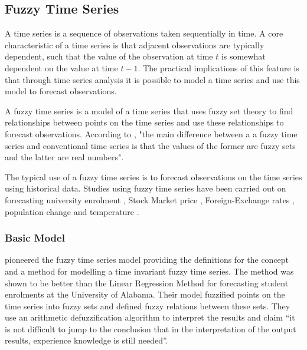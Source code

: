 \documentclass{article}
\theoremstyle{definition}
\begin{document}
\label{fuzzysettheory}

\subsection{Fuzzy Time Series}

\label{fts}

A time series is a sequence of observations taken sequentially in time. A core characteristic of a time series is that adjacent observations are typically dependent, such that the value of the observation at time $t$ is somewhat dependent on the value at time $t-1$. The practical implications of this feature is that through time series analysis it is possible to model a time series and use this model to forecast observations.

A fuzzy time series is a model of a time series that uses fuzzy set theory to find relationships between points on the time series and use these relationships to forecast observations. According to \cite{chen1996forecasting}, "the main difference between a a fuzzy time series and conventional time series is that the values of the former are fuzzy sets and the latter are real numbers".

The typical use of a fuzzy time series is to forecast observations on the time series using historical data. Studies using fuzzy time series have been carried out on forecasting university enrolment \citep{song1993forecasting, song1994forecasting, chen1996forecasting, tsai2000forecasting, chen2004new, cheng2006trend, lee2006pattern, huarng2006ratio, tsaur2012fuzzy}, Stock Market price \citep{huarng2005type, cheng2006trend, lee2006pattern, huarng2006ratio, Chen2007fib, chu2009fuzzy}, Foreign-Exchange rates \citep{tsaur2012fuzzy}, population change \citep{tsai1999study} and temperature \citep{temperatureprediction2000, lee2006pattern}. 

\subsubsection{Basic Model}
\label{basic}
\cite{song1993forecasting} pioneered the fuzzy time series model providing the definitions for the concept and a method for modelling a time invariant fuzzy time series. The method was shown to be better than the Linear Regression Method for forecasting student enrolments at the University of Alabama. Their model fuzzified points on the time series into fuzzy sets and defined fuzzy relations between these sets. They use an arithmetic defuzzification algorithm to interpret the results and claim ``it is not difficult to jump to the conclusion that in the interpretation of the output results, experience knowledge is still needed''.
 
\end{document}
